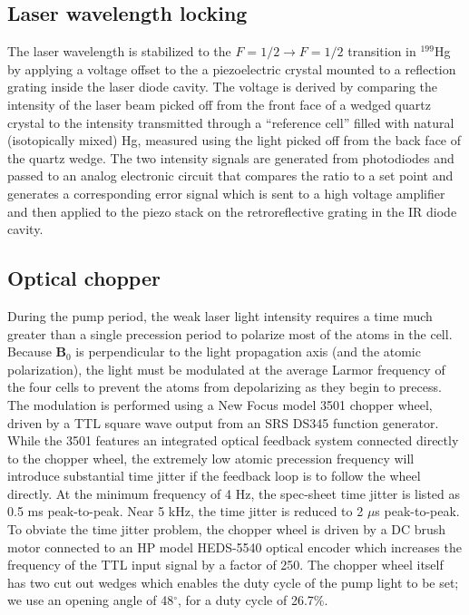 \documentclass [10pt, twoside] {uwthesis}[2012/04/02]
\begin{document}
\subsection{Laser wavelength locking}
The laser wavelength is stabilized to the $F = 1/2 \rightarrow F = 1/2$ transition in $^{199}$Hg by applying a voltage offset to the a piezoelectric crystal mounted to a reflection grating inside the laser diode cavity. The voltage is derived by comparing the intensity of the laser beam picked off from the front face of a wedged quartz crystal to the intensity transmitted through a ``reference cell'' filled with natural (isotopically mixed) Hg, measured using the light picked off from the back face of the quartz wedge. The two intensity signals are generated from photodiodes and passed to an analog electronic circuit that compares the ratio to a set point and generates a corresponding error signal which is sent to a high voltage amplifier and then applied to the piezo stack on the retroreflective grating in the IR diode cavity. 

\subsection{Optical chopper} 
During the pump period, the weak laser light intensity requires a time much greater than a single precession period to polarize most of the atoms in the cell. Because $\mathbf{B}_0$ is perpendicular to the light propagation axis (and the atomic polarization), the light must be modulated at the average Larmor frequency of the four cells to prevent the atoms from depolarizing as they begin to precess. The modulation is performed using a New Focus model 3501 chopper wheel, driven by a TTL square wave output from an SRS DS345 function generator. While the 3501 features an integrated optical feedback system connected directly to the chopper wheel, the extremely low atomic precession frequency will introduce substantial time jitter if the feedback loop is to follow the wheel directly. At the minimum frequency of 4 Hz, the spec-sheet time jitter is listed as 0.5 ms peak-to-peak. Near 5 kHz, the time jitter is reduced to 2 $\mu$s peak-to-peak. To obviate the time jitter problem, the chopper wheel is driven by a DC brush motor connected to an HP model HEDS-5540 optical encoder which increases the frequency of the TTL input signal by a factor of 250. The chopper wheel itself has two cut out wedges which enables the duty cycle of the pump light to be set; we use an opening angle of 48$^{\circ}$, for a duty cycle of 26.7\%.
\end{document}
